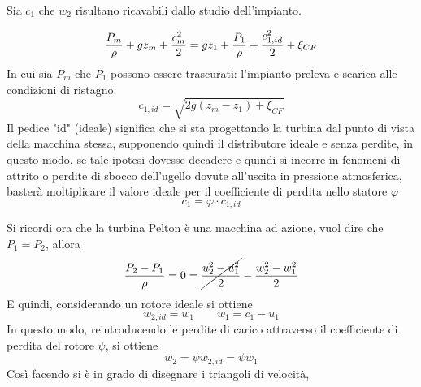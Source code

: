 \documentclass[a4paper, 15pt]{article}
\begin{document}
\begin{adjustwidth}{2in}{}
	Sia $c_1$ che $w_2$ risultano ricavabili dallo studio dell'impianto. 
	

	\[{P_m\over\rho} + gz_m + {c_m^2\over2} = gz_1+{P_1\over\rho} +{c_{1,id}^2\over2} + \xi_{CF}\]
	In cui sia $P_m$ che $P_1$ possono essere trascurati: l'impianto preleva e scarica alle condizioni di ristagno. 
	\[c_{1,id} = \sqrt{2g(z_m-z_1)+\xi_{CF}}\]
	Il pedice "id" (ideale) significa che si sta progettando la turbina dal punto di vista della macchina stessa, supponendo quindi il distributore ideale e senza perdite, in questo modo, se tale ipotesi dovesse decadere e quindi si incorre in fenomeni di attrito o perdite di sbocco dell'ugello dovute all'uscita in pressione atmosferica, basterà moltiplicare il valore ideale per il coefficiente di perdita nello statore $\varphi$
	\[c_1 = \varphi\cdot c_{1,id}\]
	
	Si ricordi ora che la turbina Pelton è una macchina ad azione, vuol dire che $P_1=P_2$, allora 
	\[\dfrac{P_2-P_1}{\rho} = 0 = \cancel{\dfrac{u^2_2-u^2_1}{2}} - \dfrac{w^2_2-w^2_1}{2}\]
	E quindi, considerando un rotore ideale si ottiene
	\[w_{2,id} = w_1\qquad w_1 = c_1 - u_1\]
	In questo modo, reintroducendo le perdite di carico attraverso il coefficiente di perdita del rotore $\psi$, si ottiene 
	\[w_2 = \psi w_{2,id} = \psi w_1 \]
	Così facendo si è in grado di disegnare i triangoli di velocità,
\end{adjustwidth}
\end{document}
